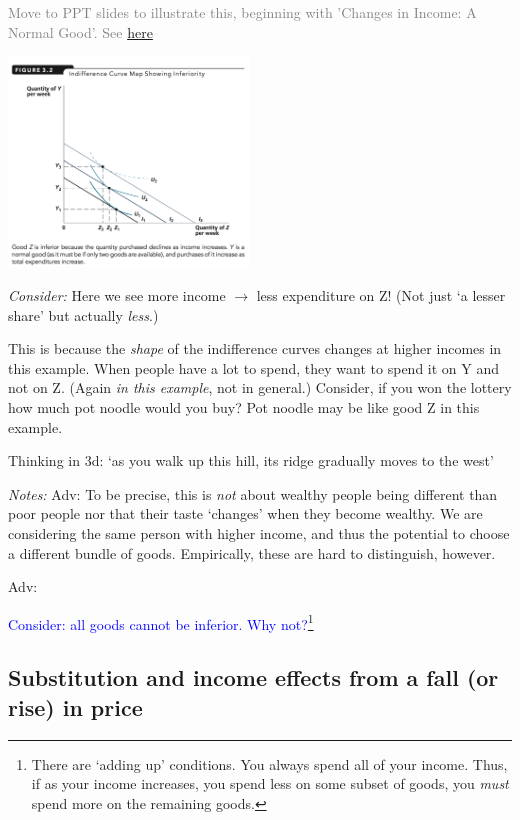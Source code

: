 \documentclass[]{article}
\begin{document}
\textcolor{gray}{Move to PPT slides to illustrate this, beginning with 'Changes in Income: A Normal Good'. See}
\href{https://www.dropbox.com/s/qhsl6qey0wjcfe5/utility_demand_supplement.pptx?dl=0}{here}

\includegraphics[height=2.2in]{picsfigs/inferiorgood.png}

\emph{Consider:} Here we see more income \(\rightarrow\) less
expenditure on Z! (Not just `a lesser share' but actually \emph{less}.)

This is because the \emph{shape} of the indifference curves changes at
higher incomes in this example. When people have a lot to spend, they
want to spend it on Y and not on Z. (Again \emph{in this example}, not
in general.) Consider, if you won the lottery how much pot noodle would
you buy? Pot noodle may be like good Z in this example.

\bigskip

Thinking in 3d: `as you walk up this hill, its ridge gradually moves to
the west'

\emph{Notes:} Adv: To be precise, this is \emph{not} about wealthy
people being different than poor people nor that their taste `changes'
when they become wealthy. We are considering the same person with higher
income, and thus the potential to choose a different bundle of goods.
Empirically, these are hard to distinguish, however.

\textcolor{RawSienna}{Adv:}

\textcolor{blue}{Consider: all goods cannot be inferior. Why not?}\footnote{There
  are `adding up' conditions. You always spend all of your income. Thus,
  if as your income increases, you spend less on some subset of goods,
  you \emph{must} spend more on the remaining goods.}

\hypertarget{substitution-and-income-effects-from-a-fall-or-rise-in-price}{%
\subsection{Substitution and income effects from a fall (or rise) in
price}\label{substitution-and-income-effects-from-a-fall-or-rise-in-price}}
\end{document}
